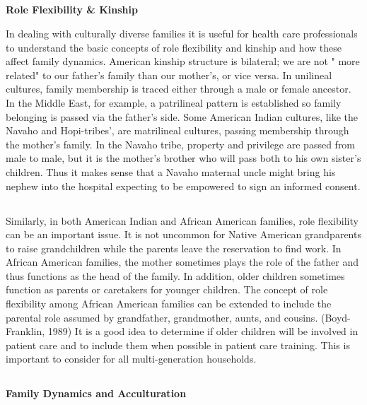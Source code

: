 \documentclass[12pt]{article}
\begin{document}
\begin{spacing}{1.5}
{			\subsection{}
			\textbf{Role Flexibility \& Kinship}
			
			In dealing with culturally diverse families it is useful for health care professionals to understand the basic concepts of role flexibility and kinship and how these affect family dynamics. American kinship structure is bilateral; we are not " more related" to our father's family than our mother's, or vice versa. In unilineal cultures, family membership is traced either through a male or female ancestor. In the Middle East, for example, a patrilineal pattern is established so family belonging is passed via the father's side. Some American Indian cultures, like the Navaho and Hopi-tribes', are matrilineal cultures, passing membership through the mother's family. In the Navaho tribe, property and privilege are passed from male to male, but it is the mother's brother who will pass both to his own sister's children. Thus it makes sense that a Navaho maternal uncle might bring his nephew into the hospital expecting to be empowered to sign an informed consent.
			
			\subsection{}
			Similarly, in both American Indian and African American families, role flexibility can be an important issue. It is not uncommon for Native American grandparents to raise grandchildren while the parents leave the reservation to find work. In African American families, the mother sometimes plays the role of the father and thus functions as the head of the family. In addition, older children sometimes function as parents or caretakers for younger children. The concept of role flexibility among African American families can be extended to include the parental role assumed by grandfather, grandmother, aunts, and cousins. (Boyd-Franklin, 1989) It is a good idea to determine if older children will be involved in patient care and to include them when possible in patient care training. This is important to consider for all multi-generation households.
			
			\subsection{}
			\textbf{Family Dynamics and Acculturation}
			
}
\end{spacing}
\end{document}
